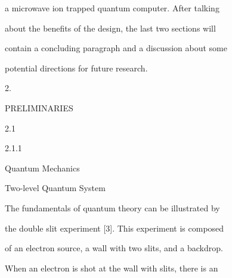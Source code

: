 \documentclass[a4paper,portrait,12pt]{article}
\begin{document}
\begin{flushleft}
a microwave ion trapped quantum computer. After talking
\end{flushleft}


\begin{flushleft}
about the benefits of the design, the last two sections will
\end{flushleft}


\begin{flushleft}
contain a concluding paragraph and a discussion about some
\end{flushleft}


\begin{flushleft}
potential directions for future research.
\end{flushleft}





2.





\begin{flushleft}
PRELIMINARIES
\end{flushleft}





2.1


2.1.1





\begin{flushleft}
Quantum Mechanics
\end{flushleft}


\begin{flushleft}
Two-level Quantum System
\end{flushleft}





\begin{flushleft}
The fundamentals of quantum theory can be illustrated by
\end{flushleft}


\begin{flushleft}
the double slit experiment [3]. This experiment is composed
\end{flushleft}


\begin{flushleft}
of an electron source, a wall with two slits, and a backdrop.
\end{flushleft}


\begin{flushleft}
When an electron is shot at the wall with slits, there is an
\end{flushleft}
\end{document}
